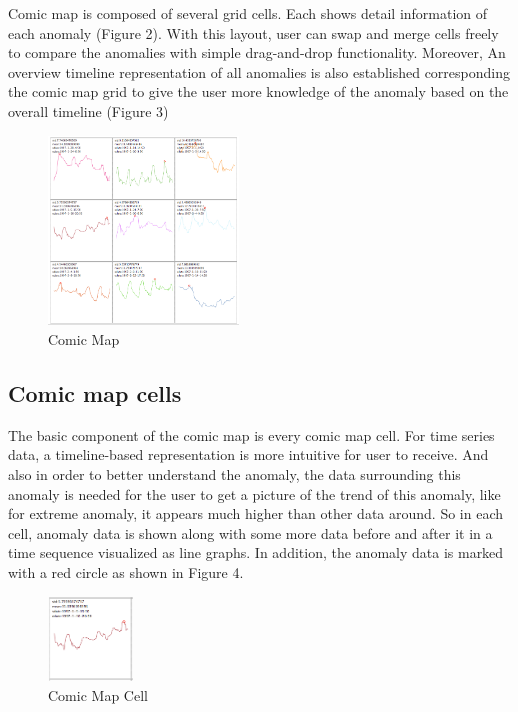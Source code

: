\documentclass{vgtc}                          %
\begin{document}
Comic map is composed of several grid cells. Each shows detail information of each anomaly (Figure 2). With this layout, user can swap and merge cells freely to compare the anomalies with simple drag-and-drop functionality. Moreover, An overview timeline representation of all anomalies is also established corresponding the comic map grid to give the user more knowledge of the anomaly based on the overall timeline (Figure 3)

 \begin{figure}[htb]
	\centering
  \includegraphics[width=0.45\textwidth]{comicMap9Cell.jpg}
  \caption{Comic Map}
\end{figure}

\subsection{Comic map cells}

The basic component of the comic map is every comic map cell. For time series data, a timeline-based representation is more intuitive for user to receive. And also in order to better understand the anomaly, the data surrounding this anomaly is needed for the user to get a picture of the trend of this anomaly, like for extreme anomaly, it appears much higher than other data around. So in each cell, anomaly data is shown along with some more data before and after it in a time sequence visualized as line graphs. In addition, the anomaly data is marked with a red circle as shown in Figure 4. 

 \begin{figure}[htb]
	\centering
  \includegraphics[width=0.20\textwidth]{onecell.jpg}
  \caption{Comic Map Cell}
\end{figure}
\end{document}
